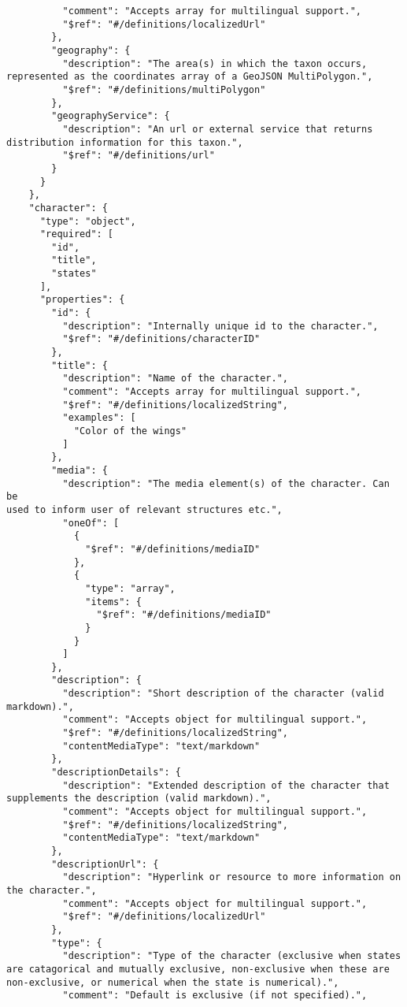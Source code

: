 \documentclass[10pt,letterpaper]{article}
\begin{document}
\begin{verbatim}
          "comment": "Accepts array for multilingual support.",
          "$ref": "#/definitions/localizedUrl"
        },
        "geography": {
          "description": "The area(s) in which the taxon occurs,
represented as the coordinates array of a GeoJSON MultiPolygon.",
          "$ref": "#/definitions/multiPolygon"
        },
        "geographyService": {
          "description": "An url or external service that returns
distribution information for this taxon.",
          "$ref": "#/definitions/url"
        }
      }
    },
    "character": {
      "type": "object",
      "required": [
        "id",
        "title",
        "states"
      ],
      "properties": {
        "id": {
          "description": "Internally unique id to the character.",
          "$ref": "#/definitions/characterID"
        },
        "title": {
          "description": "Name of the character.",
          "comment": "Accepts array for multilingual support.",
          "$ref": "#/definitions/localizedString",
          "examples": [
            "Color of the wings"
          ]
        },
        "media": {
          "description": "The media element(s) of the character. Can be
used to inform user of relevant structures etc.",
          "oneOf": [
            {
              "$ref": "#/definitions/mediaID"
            },
            {
              "type": "array",
              "items": {
                "$ref": "#/definitions/mediaID"
              }
            }
          ]
        },
        "description": {
          "description": "Short description of the character (valid
markdown).",
          "comment": "Accepts object for multilingual support.",
          "$ref": "#/definitions/localizedString",
          "contentMediaType": "text/markdown"
        },
        "descriptionDetails": {
          "description": "Extended description of the character that
supplements the description (valid markdown).",
          "comment": "Accepts object for multilingual support.",
          "$ref": "#/definitions/localizedString",
          "contentMediaType": "text/markdown"
        },
        "descriptionUrl": {
          "description": "Hyperlink or resource to more information on
the character.",
          "comment": "Accepts object for multilingual support.",
          "$ref": "#/definitions/localizedUrl"
        },
        "type": {
          "description": "Type of the character (exclusive when states
are catagorical and mutually exclusive, non-exclusive when these are
non-exclusive, or numerical when the state is numerical).",
          "comment": "Default is exclusive (if not specified).",

\end{verbatim}
\end{document}
